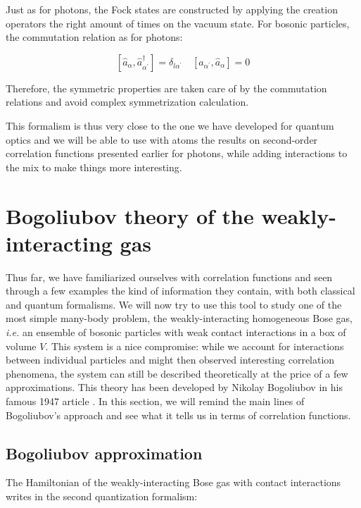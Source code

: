 Just as for photons, the Fock states are constructed by applying the creation operators the right amount of times on the vacuum state. For bosonic particles, the commutation relation as for photons:

\begin{equation}
    \left[\hat{a}_{\alpha}, \hat{a}_{\alpha^{\prime}}^{\dagger}\right]=\delta_{l \alpha^{\prime}} \quad\left[\hat{a}_{\alpha^{\prime}}, \hat{a}_{\alpha}\right]=0
\end{equation}

Therefore, the symmetric properties are taken care of by the commutation relations and avoid complex symmetrization calculation. 

This formalism is thus very close to the one we have developed for quantum optics and we will be able to use with atoms the results on second-order correlation functions presented earlier for photons, while adding interactions to the mix to make things more interesting.

\section{Bogoliubov theory of the weakly-interacting gas}

Thus far, we have familiarized ourselves with correlation functions and seen through a few examples the kind of information they contain, with both classical and quantum formalisms. We will now try to use this tool to study one of the most simple many-body problem, the weakly-interacting homogeneous Bose gas, {\it i.e.} an ensemble of bosonic particles with weak contact interactions in a box of volume $V$. This system is a nice compromise: while we account for interactions between individual particles and might then observed interesting correlation phenomena, the system can still be described theoretically at the price of a few approximations. This theory has been developed by Nikolay Bogoliubov in his famous 1947 article \cite{bogoliubov1947}. In this section, we will remind the main lines of Bogoliubov's approach and see what it tells us in terms of correlation functions.

\subsection{Bogoliubov approximation}


The Hamiltonian of the weakly-interacting Bose gas with contact interactions writes in the second quantization formalism:

